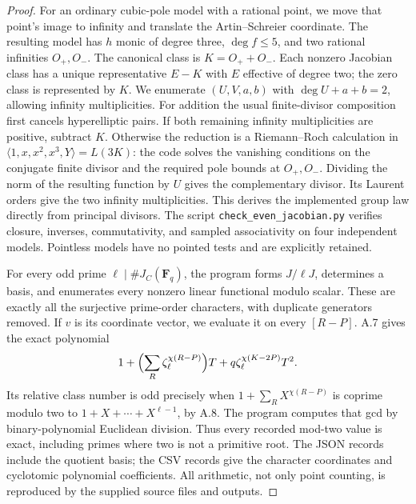 \documentclass[11pt]{article}
\begin{document}
\begin{proof}
For an ordinary cubic-pole model with a rational point, we move that
point's image to infinity and translate the Artin--Schreier
coordinate.  The resulting model has $h$ monic of degree three,
$\deg f\le5$, and two rational infinities $O_+,O_-$.
The canonical class is $K=O_++O_-$.  Each nonzero Jacobian class
has a unique representative $E-K$ with $E$ effective of degree two;
the zero class is represented by $K$.  We enumerate
$(U,V,a,b)$ with $\deg U+a+b=2$, allowing infinity multiplicities.
For addition the usual finite-divisor composition first cancels
hyperelliptic pairs.  If both remaining infinity multiplicities
are positive, subtract $K$.  Otherwise the reduction is a
Riemann--Roch calculation in
$\langle1,x,x^2,x^3,Y\rangle=L(3K)$: the code solves the vanishing
conditions on the conjugate finite divisor and the required pole
bounds at $O_+,O_-$.  Dividing the norm of the resulting function
by $U$ gives the complementary divisor.  Its Laurent orders give
the two infinity multiplicities.  This derives the implemented
group law directly from principal divisors.  The script
\texttt{check\_even\_jacobian.py} verifies closure, inverses,
commutativity, and sampled associativity on four independent models.
Pointless models have no pointed tests and are explicitly retained.

For every odd prime $\ell\mid\#J_C(\mathbf F_q)$, the program
forms $J/\ell J$, determines a basis, and enumerates every nonzero
linear functional modulo scalar.  These are exactly all the
surjective prime-order characters, with duplicate generators
removed.  If $v$ is its coordinate vector, we evaluate it on
every $[R-P]$.  A.7 gives the exact polynomial
\[
 1+\Bigl(\sum_R\zeta_\ell^{\chi(R-P)}\Bigr)T
       +q\zeta_\ell^{\chi(K-2P)}T^2.
\]
Its relative class number is odd precisely when
$1+\sum_R X^{\chi(R-P)}$ is coprime modulo two to
$1+X+\cdots+X^{\ell-1}$, by A.8.  The program computes that gcd
by binary-polynomial Euclidean division.  Thus every recorded
mod-two value is exact, including primes where two is not a
primitive root.  The JSON records include the quotient basis;
the CSV records give the character coordinates and cyclotomic
polynomial coefficients.  All arithmetic, not only point counting,
is reproduced by the supplied source files and outputs.
\end{proof}
\end{document}
